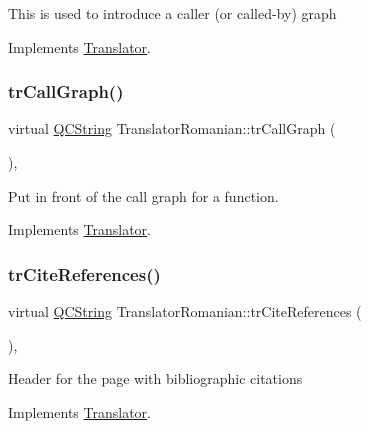 This is used to introduce a caller (or called-\/by) graph 

Implements \mbox{\hyperlink{class_translator}{Translator}}.

\mbox{\label{class_translator_romanian_acb37661c05d95a5b0dc0bbcad7d3ecea}} 
\subsubsection{\texorpdfstring{trCallGraph()}{trCallGraph()}}
{\footnotesize\ttfamily virtual \mbox{\hyperlink{class_q_c_string}{Q\+C\+String}} Translator\+Romanian\+::tr\+Call\+Graph (\begin{DoxyParamCaption}{ }\end{DoxyParamCaption})\hspace{0.3cm}{\ttfamily [inline]}, {\ttfamily [virtual]}}

Put in front of the call graph for a function. 

Implements \mbox{\hyperlink{class_translator}{Translator}}.

\mbox{\label{class_translator_romanian_a8efa96a9df9a11de154ce5c1cf89125e}} 
\subsubsection{\texorpdfstring{trCiteReferences()}{trCiteReferences()}}
{\footnotesize\ttfamily virtual \mbox{\hyperlink{class_q_c_string}{Q\+C\+String}} Translator\+Romanian\+::tr\+Cite\+References (\begin{DoxyParamCaption}{ }\end{DoxyParamCaption})\hspace{0.3cm}{\ttfamily [inline]}, {\ttfamily [virtual]}}

Header for the page with bibliographic citations 

Implements \mbox{\hyperlink{class_translator}{Translator}}.

\mbox{\label{class_translator_romanian_a2e62b11e8b020c7e91015c63bff923b2}} 
